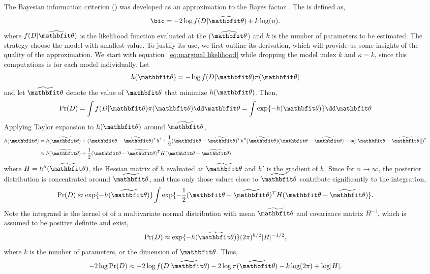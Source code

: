 The Bayesian information criterion (\bic) was developed as an approximation to
the Bayes factor \parencite{Schwarz1978}. The \bic is defined as,
\begin{equation}
  \text{\bic} = -2\log f(D|\hbth) + k\log(n).
\end{equation}
where $f(D|\hbth)$ is the likelihood function evaluated at the \mle ($\hbth$)
and $k$ is the number of parameters to be estimated. The \bic strategy choose
the model with smallest \bic value. To justify its use, we first outline its
derivation, which will provide us some insights of the quality of the
approximation. We start with equation~\eqref{eq:marginal likelihood} while
dropping the model index $k$ and $\kappa=k$, since this computations is for
each model individually. Let
\begin{equation}
  h(\bth) = - \log f(D|\bth)\pi(\bth)
\end{equation}
and let $\tbth$ denote the value of $\bth$ that minimize $h(\bth)$. Then,
\begin{equation}
  \Pr(D) = \int f(D|\bth)\pi(\bth)\dd\bth = \int\exp\{-h(\bth)\}\dd\bth
\end{equation}
Applying Taylor expansion to $h(\bth)$ around $\tbth$,
\begin{align}
  h(\bth)
  &= h(\tbth) + (\bth - \tbth)^T h'
  + \frac{1}{2}(\bth - \tbth)^T h''(\tbth) (\bth - \tbth)
  + o(\lVert \bth - \tbth \rVert)^2 \notag\\
  &\approx h(\tbth) + \frac{1}{2}(\bth - \tbth)^T H (\bth - \tbth)
\end{align}
where $H = h''(\tbth)$, the Hessian matrix of $h$ evaluated at $\tbth$ and
$h'$ is the gradient of $h$. Since for $n\to\infty$, the posterior
distribution is concentrated around $\tbth$, and thus only those values close
to $\tbth$ contribute significantly to the integration,
\begin{equation}
  \Pr(D)\approx\exp\{-h(\tbth)\}
  \int\exp\{-\frac{1}{2}(\bth - \tbth)^TH(\bth - \tbth)\}.
\end{equation}
Note the integrand is the kernel of of a multivariate normal distribution with
mean $\tbth$ and covariance matrix $H^{-1}$, which is assumed to be positive
definite and exist,
\begin{equation}
  \Pr(D) \approx \exp\{-h(\tbth)\} (2\pi)^{k/2} \lvert H \rvert^{-1/2},
\end{equation}
where $k$ is the number of parameters, or the dimension of $\bth$. Thus,
\begin{equation}
  -2\log\Pr(D) \approx
  -2\log f(D|\tbth) - 2\log\pi(\tbth) - k\log(2\pi) + \log\lvert H \rvert.
  \label{eq:bic approx}
\end{equation}
